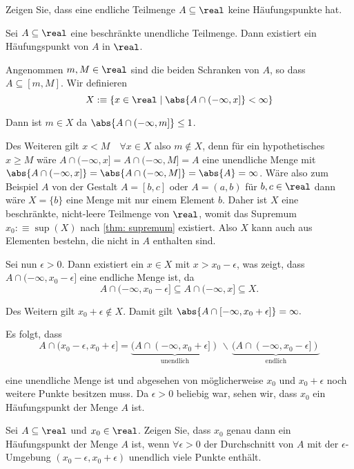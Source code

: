 \begin{ex} Zeigen Sie, dass eine endliche Teilmenge $A \subseteq\real$ keine Häufungspunkte hat.
\end{ex}

\begin{thm}
  Sei $A \subseteq \real$ eine beschränkte unendliche Teilmenge. Dann existiert ein Häufungspunkt von $A$ in $\real$.
\end{thm}
\begin{prf}
  Angenommen $m, M \in \real$ sind die beiden Schranken von $A$, so dass $A \subseteq [m,M]$. Wir definieren
  \[
    X :\equiv \{ x \in \real \mid \abs{A \cap (-\infty, x] } < \infty \}
  \]

  Dann ist $m \in X$ da $\abs{A \cap (-\infty,m]} \leq 1$.

  Des Weiteren gilt $x < M \quad \forall x \in X$ also $m \notin X$, denn für ein hypothetisches $x \geq M$ wäre $A \cap (-\infty,x] = A \cap (-\infty, M] = A$ eine unendliche Menge mit $\abs{A \cap (-\infty,x]} = \abs{A \cap (-\infty, M]} = \abs{A}=\infty$. Wäre also zum Beispiel $A$ von der Gestalt $A=[b,c]$ oder $A = (a,b)$ für $b,c \in \real$ dann wäre $X=\{b \}$ eine Menge mit nur einem Element $b$.
  Daher ist $X$ eine beschränkte, nicht-leere Teilmenge von $\real$, womit das Supremum $x_0 :\equiv \sup(X)$ nach \ref{thm: supremum} existiert. Also $X$ kann auch aus Elementen bestehn, die nicht in $A$ enthalten sind.

  Sei nun $\epsilon>0$. Dann existiert ein $x\in X$ mit $x > x_0 - \epsilon$, was zeigt, dass $A\cap (-\infty, x_0 -\epsilon]$ eine endliche Menge ist, da
  \[
    A\cap (-\infty, x_0 -\epsilon] \subseteq A \cap (-\infty, x] \subseteq X.
  \]

  Des Weitern gilt $x_0 + \epsilon \notin X$. Damit gilt
  $
    \abs{A \cap [-\infty, x_0 + \epsilon]} = \infty.
  $

  Es folgt, dass
  \[
    A \cap (x_0 - \epsilon, x_0 + \epsilon] =
    \underbrace{(A \cap (-\infty, x_0 + \epsilon])}_{\text{unendlich}} \, \backslash \,  \underbrace{(A \cap (-\infty, x_0 - \epsilon])}_{\text{endlich}}
  \]

  eine unendliche Menge ist und abgesehen von möglicherweise $x_0$ und
  $x_0 + \epsilon$ noch weitere Punkte besitzen muss. Da $\epsilon > 0$ beliebig war, sehen wir, dass $x_0$ ein Häufungspunkt der Menge $A$ ist.
\end{prf}

\begin{ex}
  Sei $A \subseteq \real$ und $x_0 \in \real$. Zeigen Sie, dass $x_0$ genau dann ein Häufungspunkt der Menge $A$ ist, wenn $\forall \epsilon > 0$ der Durchschnitt von $A$ mit der $\epsilon$-Umgebung $(x_0 - \epsilon, x_0 + \epsilon)$ unendlich viele Punkte enthält.
\end{ex}

